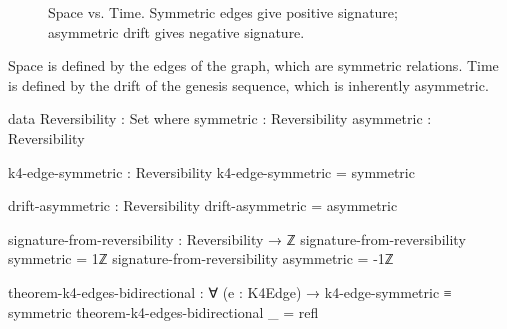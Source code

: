 \documentclass[11pt,a4paper]{book}
\begin{document}
\begin{figure}[h]
\centering
{}
\caption{Space vs. Time. Symmetric edges give positive signature; asymmetric drift gives negative signature.}
\label{fig:time-emergence}
\end{figure}

Space is defined by the edges of the graph, which are symmetric relations. Time is defined by the drift of the genesis sequence, which is inherently asymmetric.

\begin{code}
data Reversibility : Set where
  symmetric  : Reversibility
  asymmetric : Reversibility

k4-edge-symmetric : Reversibility
k4-edge-symmetric = symmetric

drift-asymmetric : Reversibility
drift-asymmetric = asymmetric

signature-from-reversibility : Reversibility → ℤ
signature-from-reversibility symmetric  = 1ℤ
signature-from-reversibility asymmetric = -1ℤ
\end{code}

\begin{code}
theorem-k4-edges-bidirectional : ∀ (e : K4Edge) → k4-edge-symmetric ≡ symmetric
theorem-k4-edges-bidirectional _ = refl

\end{code}
\end{document}
